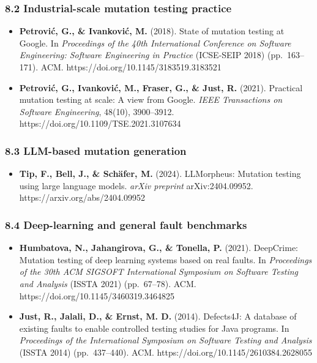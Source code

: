 \documentclass[review,12pt,authoryear]{elsarticle}
\providecommand{\tightlist}{\setlength{\itemsep}{0pt}\setlength{\parskip}{0pt}}
\begin{document}
\subsubsection{8.2 Industrial-scale mutation testing
practice}\label{industrial-scale-mutation-testing-practice}

\begin{itemize}
\tightlist
\item
  \textbf{Petrović, G., \& Ivanković, M.} (2018). State of mutation
  testing at Google. In \emph{Proceedings of the 40th International
  Conference on Software Engineering: Software Engineering in Practice}
  (ICSE-SEIP 2018) (pp.~163--171). ACM.
  https://doi.org/10.1145/3183519.3183521
\item
  \textbf{Petrović, G., Ivanković, M., Fraser, G., \& Just, R.} (2021).
  Practical mutation testing at scale: A view from Google. \emph{IEEE
  Transactions on Software Engineering}, 48(10), 3900--3912.
  https://doi.org/10.1109/TSE.2021.3107634
\end{itemize}

\subsubsection{8.3 LLM-based mutation
generation}\label{llm-based-mutation-generation}

\begin{itemize}
\tightlist
\item
  \textbf{Tip, F., Bell, J., \& Schäfer, M.} (2024). LLMorpheus:
  Mutation testing using large language models. \emph{arXiv preprint}
  arXiv:2404.09952. https://arxiv.org/abs/2404.09952
\end{itemize}

\subsubsection{8.4 Deep-learning and general fault
benchmarks}\label{deep-learning-and-general-fault-benchmarks}

\begin{itemize}
\tightlist
\item
  \textbf{Humbatova, N., Jahangirova, G., \& Tonella, P.} (2021).
  DeepCrime: Mutation testing of deep learning systems based on real
  faults. In \emph{Proceedings of the 30th ACM SIGSOFT International
  Symposium on Software Testing and Analysis} (ISSTA 2021) (pp.~67--78).
  ACM. https://doi.org/10.1145/3460319.3464825
\item
  \textbf{Just, R., Jalali, D., \& Ernst, M. D.} (2014). Defects4J: A
  database of existing faults to enable controlled testing studies for
  Java programs. In \emph{Proceedings of the International Symposium on
  Software Testing and Analysis} (ISSTA 2014) (pp.~437--440). ACM.
  https://doi.org/10.1145/2610384.2628055
\end{itemize}
\end{document}
